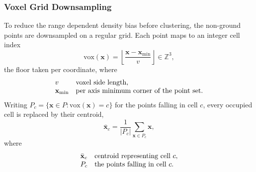 \documentclass[a4paper,12pt]{report}
\begin{document}
\subsubsection{Voxel Grid Downsampling}
\label{sec:th-voxel}
To reduce the range dependent density bias before clustering, the non-ground points are
downsampled on a regular grid. Each point maps to an integer cell index
\begin{equation}
  \mathrm{vox}(\mathbf{x}) = \left\lfloor \frac{\mathbf{x} - \mathbf{x}_{\min}}{v} \right\rfloor \in \mathbb{Z}^3 ,
\end{equation}
the floor taken per coordinate, where
\[
  \begin{array}{@{}l@{\quad}l@{}}
    v & \text{voxel side length,}\\
    \mathbf{x}_{\min} & \text{per axis minimum corner of the point set.}
  \end{array}
\]
Writing $P_c = \{\mathbf{x}\in P : \mathrm{vox}(\mathbf{x}) = c\}$ for the points falling in
cell $c$, every occupied cell is replaced by their centroid,
\begin{equation}
  \bar{\mathbf{x}}_c = \frac{1}{\lvert P_c\rvert} \sum_{\mathbf{x}\in P_c} \mathbf{x} ,
\end{equation}
where
\[
  \begin{array}{@{}l@{\quad}l@{}}
    \bar{\mathbf{x}}_c & \text{centroid representing cell } c,\\
    P_c & \text{the points falling in cell } c.
  \end{array}
\]
\end{document}
